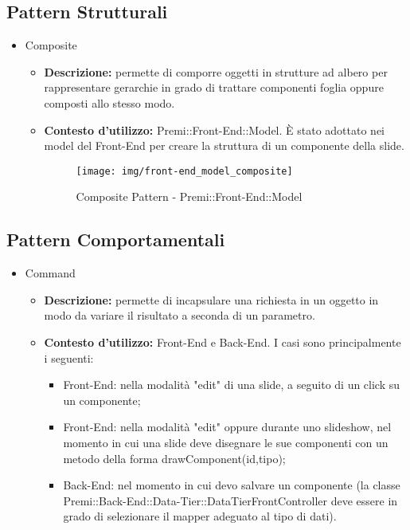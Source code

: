 \subsection{Pattern Strutturali}
\begin{itemize}
	\item Composite
	\begin{itemize}
		\item \textbf{Descrizione:} permette di comporre oggetti in strutture ad albero per rappresentare gerarchie in grado di trattare componenti foglia oppure composti allo stesso modo.
		\item \textbf{Contesto d'utilizzo:} Premi::Front-End::Model. È stato adottato nei model del \gls{Front-End} per creare la struttura di un componente della slide. 
		\begin{figure}[h]
			\centering
			\texttt{[image: img/front-end\_model\_composite]}
			\caption[Composite Pattern - Premi::Front-End::Model]{Composite Pattern - Premi::Front-End::Model}
		\end{figure}
	\end{itemize}

\end{itemize}

\subsection{Pattern Comportamentali}
\begin{itemize}
	\item Command
	\begin{itemize}
		\item \textbf{Descrizione:} permette di incapsulare una richiesta in un oggetto in modo da variare il risultato a seconda di un parametro.
		\item \textbf{Contesto d'utilizzo:} \gls{Front-End} e \gls{Back-End}. I casi sono principalmente i seguenti:
		\begin{itemize}
			\item \gls{Front-End}: nella modalità "edit" di una \gls{slide}, a seguito di un click su un componente;
			\item \gls{Front-End}: nella modalità "edit" oppure durante uno slideshow, nel momento in cui una \gls{slide} deve disegnare le sue componenti con un metodo della forma drawComponent(id,tipo);
			\item \gls{Back-End}: nel momento in cui devo salvare un componente (la classe Premi::\gls{Back-End}::Data-Tier::DataTierFrontController deve essere in grado di selezionare il mapper adeguato al tipo di dati).
		\end{itemize}
	\end{itemize}
\end{itemize}


